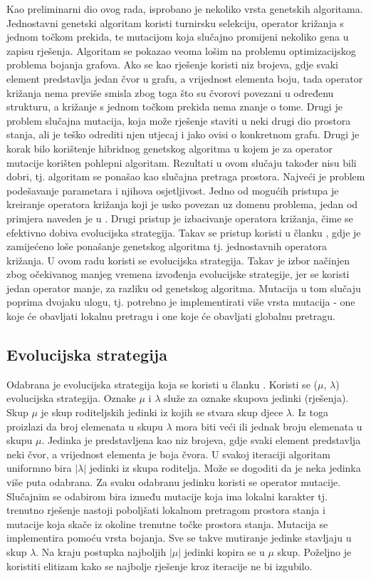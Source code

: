 \documentclass[times, utf8, diplomski, numeric]{fer}
\begin{document}
Kao preliminarni dio ovog rada, isprobano je nekoliko vrsta genetskih algoritama. Jednostavni genetski algoritam koristi turnirsku selekciju, operator križanja s jednom točkom prekida, te mutacijom koja slučajno promijeni nekoliko gena u zapisu rješenja. Algoritam se pokazao veoma lošim na problemu optimizacijskog problema bojanja grafova. Ako se kao rješenje koristi niz brojeva, gdje svaki element predstavlja jedan čvor u grafu, a vrijednost elementa boju, tada operator križanja nema previše smisla zbog toga što su čvorovi povezani u određenu strukturu, a križanje s jednom točkom prekida nema znanje o tome. Drugi je problem slučajna mutacija, koja može rješenje staviti u neki drugi dio prostora stanja, ali je teško odrediti njen utjecaj i jako ovisi o konkretnom grafu. Drugi je korak bilo korištenje hibridnog genetskog algoritma u kojem je za operator mutacije korišten pohlepni algoritam. Rezultati u ovom slučaju također nisu bili dobri, tj. algoritam se ponašao kao slučajna pretraga prostora. Najveći je problem podešavanje parametara i njihova osjetljivost. Jedno od mogućih pristupa je kreiranje operatora križanja koji je usko povezan uz domenu problema, jedan od primjera naveden je u \cite{lit17}. Drugi pristup je izbacivanje operatora križanja, čime se efektivno dobiva evolucijska strategija. Takav se pristup koristi u članku \cite{lit12}, gdje je zamijećeno loše ponašanje genetskog algoritma tj. jednostavnih operatora križanja. U ovom radu koristi se evolucijska strategija. Takav je izbor načinjen zbog očekivanog manjeg vremena izvođenja evolucijske strategije, jer se koristi jedan operator manje, za razliku od genetskog algoritma. Mutacija u tom slučaju poprima dvojaku ulogu, tj. potrebno je implementirati više vrsta mutacija - one koje će obavljati lokalnu pretragu i one koje će obavljati globalnu pretragu.

\subsection{Evolucijska strategija}

Odabrana je evolucijska strategija koja se koristi u članku \cite{lit17}. Koristi se ($\mu$, $\lambda$) evolucijska strategija. Oznake $\mu$ i $\lambda$ služe za oznake skupova jedinki (rješenja). Skup $\mu$ je skup roditeljskih jedinki iz kojih se stvara skup djece $\lambda$. Iz toga proizlazi da broj elemenata u skupu $\lambda$ mora biti veći ili jednak broju elemenata u skupu $\mu$. Jedinka je predstavljena kao niz brojeva, gdje svaki element predstavlja neki čvor, a vrijednost elementa je boja čvora. U svakoj iteraciji algoritam uniformno bira $|\lambda|$ jedinki iz skupa roditelja. Može se dogoditi da je neka jedinka više puta odabrana. Za svaku odabranu jedinku koristi se operator mutacije. Slučajnim se odabirom bira između mutacije koja ima lokalni karakter tj. trenutno rješenje nastoji poboljšati lokalnom pretragom prostora stanja i mutacije koja skače iz okoline trenutne točke prostora stanja. Mutacija se implementira pomoću vrsta bojanja. Sve se takve mutiranje jedinke stavljaju u skup $\lambda$. Na kraju postupka najboljih $|\mu|$ jedinki kopira se u $\mu$ skup. Poželjno je koristiti elitizam kako se najbolje rješenje kroz iteracije ne bi izgubilo.
\end{document}
